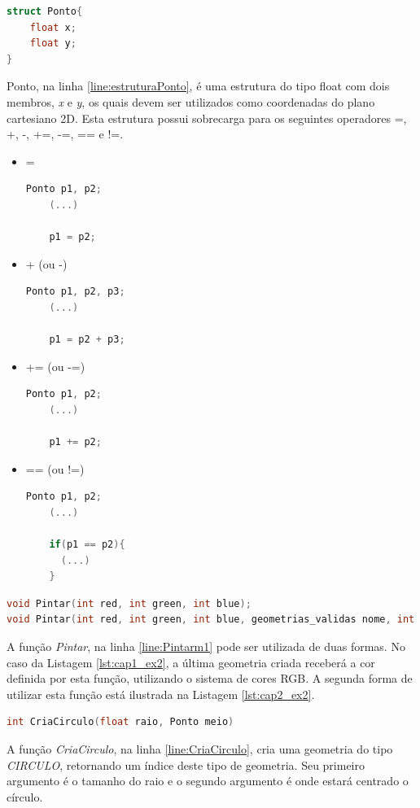 \begin{lstlisting}[label={func:Ponto},language=C++]
struct Ponto{
    float x;
    float y;
}
\end{lstlisting}
Ponto, na linha \ref{line:estruturaPonto}, é uma estrutura do tipo float com dois membros, \emph{x} e \emph{y}, os quais devem ser utilizados como coordenadas do plano cartesiano 2D. Esta estrutura possui sobrecarga para os seguintes operadores =, +, -, +=, -=, == e !=.
\begin{itemize}
  \item =
    \begin{lstlisting}[style=customc,language=C++]
    Ponto p1, p2;
    (...)

    p1 = p2;
    \end{lstlisting}
   \item + (ou -)
    \begin{lstlisting}[style=customc,language=C++]
    Ponto p1, p2, p3;
    (...)

    p1 = p2 + p3;
    \end{lstlisting} 
     \item += (ou -=)
    \begin{lstlisting}[style=customc,language=C++]
    Ponto p1, p2;
    (...)

    p1 += p2;
    \end{lstlisting}

     \item == (ou !=)
    \begin{lstlisting}[style=customc,language=C++]
    Ponto p1, p2;
    (...)

    if(p1 == p2){
      (...)
    }
    \end{lstlisting}
\end{itemize}

\begin{lstlisting}[label={func:Pintarm1},language=C++]
void Pintar(int red, int green, int blue); 
void Pintar(int red, int green, int blue, geometrias_validas nome, int index);
\end{lstlisting}
A função \emph{Pintar}, na linha \ref{line:Pintarm1} pode ser utilizada de duas formas. No caso da Listagem \ref{lst:cap1_ex2}, a última geometria criada receberá a cor definida por esta função, utilizando o sistema de cores RGB. A segunda forma de utilizar esta função está ilustrada na Listagem \ref{lst:cap2_ex2}.

\begin{lstlisting}[label={func:CriaCirculo},language=C++]
int CriaCirculo(float raio, Ponto meio)
\end{lstlisting}
A função \emph{CriaCirculo}, na linha \ref{line:CriaCirculo}, cria uma geometria do tipo \emph{CIRCULO}, retornando um índice deste tipo de geometria. Seu primeiro argumento é o tamanho do raio e o segundo argumento é onde estará centrado o círculo.

